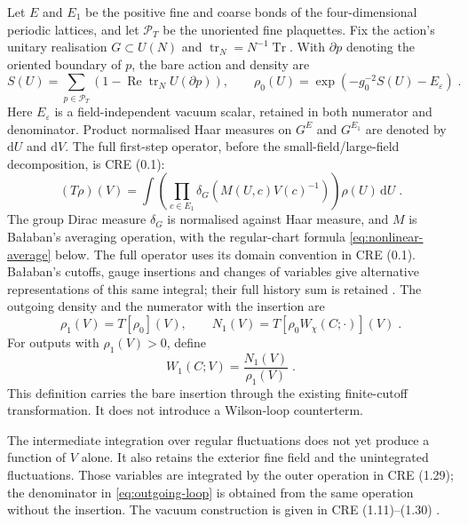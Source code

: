 \documentclass[11pt]{article}
\newcommand{\dd}{\mathrm{d}}
\newcommand{\tr}{\operatorname{tr}}
\begin{document}
Let $E$ and $E_1$ be the positive fine and coarse bonds of the four-dimensional periodic lattices, and let $\mathcal P_T$ be the unoriented fine plaquettes. Fix the action's unitary realisation $G\subset U(N)$ and $\tr_N=N^{-1}\operatorname{Tr}$. With $\partial p$ denoting the oriented boundary of $p$, the bare action and density are
\begin{equation}\label{eq:bare-action}
    S(U)=\sum_{p\in \mathcal P_T}
        (1-\operatorname{Re}\tr_N U(\partial p)),
    \qquad \rho_0(U)=\exp(-g_0^{-2}S(U)-E_\varepsilon)\;.
\end{equation}
Here $E_\varepsilon$ is a field-independent vacuum scalar, retained in both numerator and denominator. Product normalised Haar measures on $G^E$ and $G^{E_1}$ are denoted by $\dd U$ and $\dd V$. The full first-step operator, before the small-field/large-field decomposition, is CRE (0.1):
\begin{equation}\label{eq:bare-blocking-operator}
    (T\rho)(V)=\int
        \left(\prod_{c\in E_1}\delta_G(M(U,c)V(c)^{-1})\right)
        \rho(U)\,\dd U\;.
\end{equation}
The group Dirac measure $\delta_G$ is normalised against Haar measure, and $M$ is Ba{\l}aban's averaging operation, with the regular-chart formula \eqref{eq:nonlinear-average} below. The full operator uses its domain convention in CRE (0.1). Ba{\l}aban's cutoffs, gauge insertions and changes of variables give alternative representations of this same integral; their full history sum is retained \cite{BalabanCRE}. The outgoing density and the numerator with the insertion are
\begin{equation}\label{eq:first-step}
    \rho_1(V)=T[\rho_0](V),
    \qquad N_1(V)=T[\rho_0 W_\chi(C;\cdot)](V)\;.
\end{equation}
For outputs with $\rho_1(V)>0$, define
\begin{equation}\label{eq:outgoing-loop}
    W_1(C;V)=\frac{N_1(V)}{\rho_1(V)}\;.
\end{equation}
This definition carries the bare insertion through the existing finite-cutoff transformation. It does not introduce a Wilson-loop counterterm.

The intermediate integration over regular fluctuations does not yet produce a function of $V$ alone. It also retains the exterior fine field and the unintegrated fluctuations. Those variables are integrated by the outer operation in CRE (1.29); the denominator in \eqref{eq:outgoing-loop} is obtained from the same operation without the insertion. The vacuum construction is given in CRE (1.11)--(1.30) \cite{BalabanCRE}.
\end{document}
